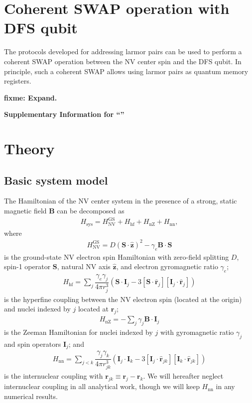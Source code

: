 \documentclass[twocolumn]{revtex4-1}
\renewcommand{\t}{\text} %
\newcommand{\f}[2]{\dfrac{#1}{#2}} %
\newcommand{\p}[1]{\left(#1\right)} %
\renewcommand{\sp}[1]{\left[#1\right]} %
\renewcommand{\v}{\bm} %
\newcommand{\uv}[1]{\hat{\v{#1}}} %
\renewcommand{\c}{\cdot} %
\newcommand{\NV}{\t{NV}}
\newcommand{\fixme}[1]{{\bf \color{red} fixme: #1}}
\begin{document}
\section{Coherent SWAP operation with DFS qubit}

The protocols developed for addressing larmor pairs can be used to
perform a coherent SWAP operation between the NV center spin and the
DFS qubit. In principle, such a coherent SWAP allows using larmor
pairs as quantum memory registers.

\fixme{Expand.}




\pagebreak
\clearpage
\widetext \makeatletter
\begin{center}
  \large \bf Supplementary Information for ``\@title''
\end{center}
\setcounter{equation}{0} \setcounter{figure}{0} \setcounter{table}{0}
\setcounter{page}{1} \renewcommand{\theequation}{S\arabic{equation}}
\renewcommand{\thefigure}{S\arabic{figure}}
\renewcommand{\bibnumfmt}[1]{[S#1]}
\renewcommand{\citenumfont}[1]{S#1}

\tableofcontents{}

\section{Theory}

\subsection{Basic system model}

The Hamiltonian of the NV center system in the presence of a strong,
static magnetic field $\v B$ can be decomposed as
\begin{align}
  H_{\t{sys}} = H_\NV^{\t{GS}} + H_{\t{hf}} + H_{\t{nZ}}  + H_{\t{nn}},
\end{align}
where
\begin{align}
  H_\NV^{\t{GS}} = D\p{\v S\c\uv z}^2 - \gamma_e\v B\c\v S
\end{align}
is the ground-state NV electron spin Hamiltonian with zero-field
splitting $D$, spin-1 operator $\v S$, natural NV axis $\uv z$, and
electron gyromagnetic ratio $\gamma_e$;
\begin{align}
  H_{\t{hf}} = \sum_j\f{\gamma_e\gamma_j}{4\pi r_j^3}
  \p{\v S\c\v I_j-3\sp{\v S\c\uv r_j}\sp{\v I_j\c\uv r_j}}
\end{align}
is the hyperfine coupling between the NV electron spin (located at the
origin) and nuclei indexed by $j$ located at $\v r_j$;
\begin{align}
  H_{\t{nZ}} = -\sum_j\gamma_j\v B\c\v I_j
\end{align}
is the Zeeman Hamiltonian for nuclei indexed by $j$ with gyromagnetic
ratio $\gamma_j$ and spin operators $\v I_j$; and
\begin{align}
  H_{\t{nn}} = \sum_{j<k}\f{\gamma_j\gamma_k}{4\pi r_{jk}^3}
  \p{\v I_j\c\v I_k-3\sp{\v I_j\c\uv r_{jk}}\sp{\v I_k\c\uv r_{jk}}}
\end{align}
is the internuclear coupling with $\v r_{jk}\equiv\v r_j-\v r_k$. We
will hereafter neglect internuclear coupling in all analytical work,
though we will keep $H_{\t{nn}}$ in any numerical results.
\end{document}
